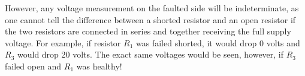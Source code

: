 However, any voltage measurement on the faulted side will be indeterminate, as one cannot tell the difference between a shorted resistor and an open resistor if the two resistors are connected in series and together receiving the full supply voltage.  For example, if resistor $R_1$ was failed shorted, it would drop 0 volts and $R_3$ would drop 20 volts.  The exact same voltages would be seen, however, if $R_3$ failed open and $R_1$ was healthy!



